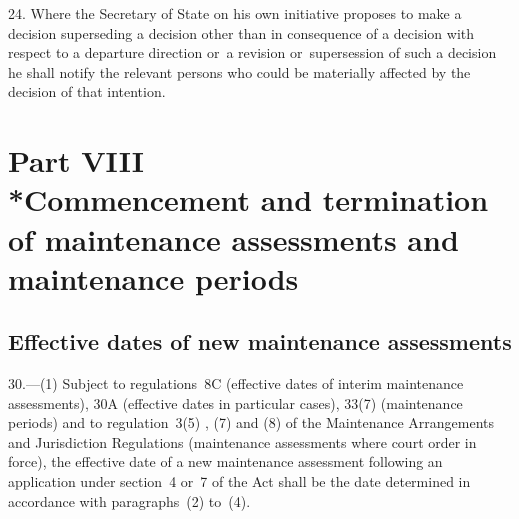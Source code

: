 \documentclass[a4paper,12pt]{article}
\begin{document}
24.  Where the Secretary of State on his own initiative proposes to make a decision superseding a decision other than in consequence of a decision with respect to a departure direction or~a revision or~supersession of such a decision he shall notify the relevant persons who could be materially affected by the decision of that intention.

\section[Part VIII --- Commencement and termination of maintenance assessments and maintenance periods]{\sloppy Part VIII\\*Commencement and termination of maintenance assessments and maintenance periods}

\renewcommand\parthead{--- Part VIII}

\subsection[30. Effective dates of new maintenance assessments]{Effective dates of new maintenance assessments}

30.—(1) Subject to 
regulations~8C (effective dates of interim maintenance assessments), 30A (effective dates in particular cases), 33(7) (maintenance periods)  %
and to regulation~3(5)%
, (7) and (8)  %
of the Maintenance Arrangements and Jurisdiction Regulations (maintenance assessments where court order in force),  %
 the effective date of a new maintenance assessment following an application under section~4
or~7 of the Act shall be the date determined in accordance with paragraphs~(2) to~(4).

%
%
\end{document}
